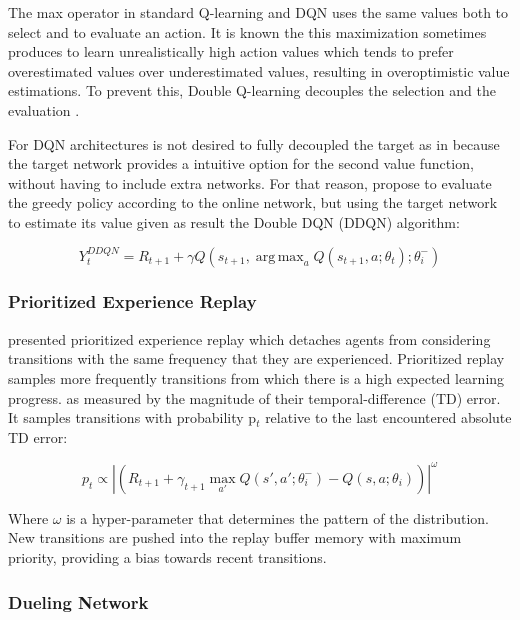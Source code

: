 \documentclass{llncs}
\DeclareMathOperator*{\argmax}{arg\,max}
\begin{document}
	The max operator in standard Q-learning and DQN uses the same values both to select and to evaluate an action. It is known the this maximization sometimes produces to learn unrealistically high action values which tends to prefer overestimated values over underestimated values, resulting in overoptimistic value estimations. To prevent this, Double Q-learning decouples the selection and the evaluation \cite{Hasselt2010}.
	
	For DQN architectures is not desired to fully decoupled the target  as in \cite{Hasselt2010} because the target network provides a intuitive option for the second value function, without having to include extra networks. For that reason, \cite{Hasselt:2016:DRL:3016100.3016191} propose to evaluate the greedy policy according to the online network, but using the target network to estimate its value given as result the Double DQN (DDQN) algorithm:
	
\begin{equation}
Y_{t}^{DDQN} = R_{t+1} + \gamma Q(s_{t+1}, \argmax_{a} Q(s_{t+1}, a;\theta_{t});\theta_{i}^{-})
\end{equation}

\subsubsection{Prioritized Experience Replay}

\cite{Mnih2015a} presented prioritized experience replay which detaches agents from considering transitions with the same frequency that they are experienced. Prioritized replay samples more frequently transitions from which there is a high expected learning progress. as measured by the magnitude of their temporal-difference (TD) error. It samples transitions with probability p$_{t}$ relative to the last encountered absolute TD error:
	
\begin{equation}
p_{t} \propto \left|\left(R_{t+1} + \gamma_{t+1} \max_{a'}Q\left(s',a';\theta_{i}^{-}\right) - Q\left(s,a;\theta_{i}\right)\right)\right|^{\omega}
\end{equation}

Where $\omega$ is a hyper-parameter that determines the pattern of the distribution. New transitions are pushed into the replay buffer memory with maximum priority, providing a bias towards recent transitions.

\subsubsection{Dueling Network}\label{duelingNet}
\end{document}
